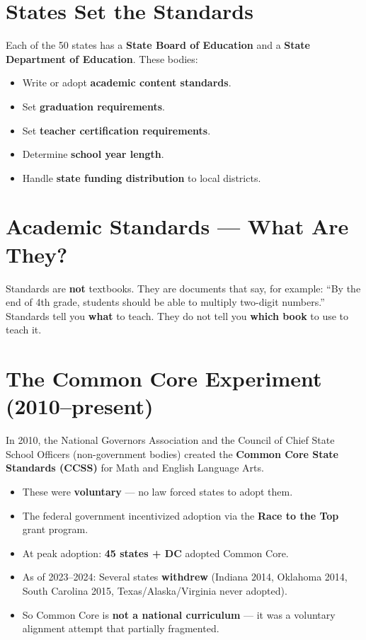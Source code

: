 \section{States Set the Standards}

Each of the 50 states has a \textbf{State Board of Education} and a \textbf{State Department of Education}. These bodies:
\begin{itemize}
	\item Write or adopt \textbf{academic content standards}.
	\item Set \textbf{graduation requirements}.
	\item Set \textbf{teacher certification requirements}.
	\item Determine \textbf{school year length}.
	\item Handle \textbf{state funding distribution} to local districts.
\end{itemize}

\section{Academic Standards --- What Are They?}

Standards are \textbf{not} textbooks. They are documents that say, for example: ``By the end of 4th grade, students should be able to multiply two-digit numbers.'' Standards tell you \textbf{what} to teach. They do not tell you \textbf{which book} to use to teach it.

\section{The Common Core Experiment (2010--present)}

In 2010, the National Governors Association and the Council of Chief State School Officers (non-government bodies) created the \textbf{Common Core State Standards (CCSS)} for Math and English Language Arts.

\begin{itemize}
	\item These were \textbf{voluntary} --- no law forced states to adopt them.
	\item The federal government incentivized adoption via the \textbf{Race to the Top} grant program.
	\item At peak adoption: \textbf{45 states + DC} adopted Common Core.
	\item As of 2023--2024: Several states \textbf{withdrew} (Indiana 2014, Oklahoma 2014, South Carolina 2015, Texas/Alaska/Virginia never adopted).
	\item So Common Core is \textbf{not a national curriculum} --- it was a voluntary alignment attempt that partially fragmented.
\end{itemize}

